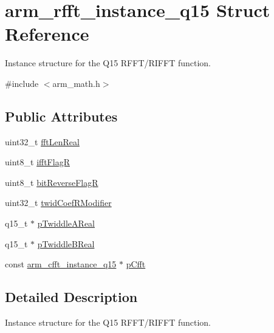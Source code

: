 \hypertarget{structarm__rfft__instance__q15}{\section{arm\-\_\-rfft\-\_\-instance\-\_\-q15 Struct Reference}
\label{structarm__rfft__instance__q15}
}


Instance structure for the Q15 R\-F\-F\-T/\-R\-I\-F\-F\-T function.  




{\ttfamily \#include $<$arm\-\_\-math.\-h$>$}

\subsection*{Public Attributes}
\begin{DoxyCompactItemize}
\item 
uint32\-\_\-t \hyperlink{structarm__rfft__instance__q15_aac5cf9e825917cbb14f439e56bb86ab3}{fft\-Len\-Real}
\item 
uint8\-\_\-t \hyperlink{structarm__rfft__instance__q15_a8051ffe268c147e431e1bea7bb4c4258}{ifft\-Flag\-R}
\item 
uint8\-\_\-t \hyperlink{structarm__rfft__instance__q15_a4c65cd40e0098ec2f5c0dc31488b9bc6}{bit\-Reverse\-Flag\-R}
\item 
uint32\-\_\-t \hyperlink{structarm__rfft__instance__q15_afd444d05858c5f419980e94e8240d5c3}{twid\-Coef\-R\-Modifier}
\item 
q15\-\_\-t $\ast$ \hyperlink{structarm__rfft__instance__q15_affbf2de522ac029432d98e8373c0ec53}{p\-Twiddle\-A\-Real}
\item 
q15\-\_\-t $\ast$ \hyperlink{structarm__rfft__instance__q15_a937d815022adc557b435ba8c6cd58b0d}{p\-Twiddle\-B\-Real}
\item 
const \hyperlink{structarm__cfft__instance__q15}{arm\-\_\-cfft\-\_\-instance\-\_\-q15} $\ast$ \hyperlink{structarm__rfft__instance__q15_a4329c15b056444746d37ff082a24d31a}{p\-Cfft}
\end{DoxyCompactItemize}


\subsection{Detailed Description}
Instance structure for the Q15 R\-F\-F\-T/\-R\-I\-F\-F\-T function. 

